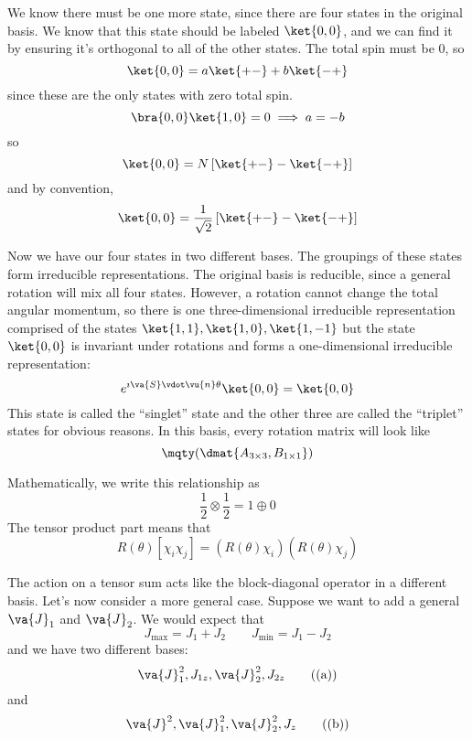 \documentclass[a4paper,twoside,master.tex]{subfiles}
\begin{document}
We know there must be one more state, since there are four states in the original basis. We know that this state should be labeled $\ket{0,0} $, and we can find it by ensuring it's orthogonal to all of the other states. The total spin must be $ 0 $, so
\begin{equation}
    \ket{0,0} = a\ket{+-} + b\ket{-+}
\end{equation}
since these are the only states with zero total spin.
\begin{equation}
    \bra{0,0}\ket{1,0} = 0 \implies a = -b
\end{equation}
so
\begin{equation}
    \ket{0,0} = N\left[\ket{+-} -\ket{-+} \right]
\end{equation}
and by convention,
\begin{equation}
    \ket{0,0} = \frac{1}{\sqrt{2}} \left[\ket{+-} -\ket{-+} \right]
\end{equation}

Now we have our four states in two different bases. The groupings of these states form irreducible representations. The original basis is reducible, since a general rotation will mix all four states. However, a rotation cannot change the total angular momentum, so there is one three-dimensional irreducible representation comprised of the states $\ket{1,1},\ket{1,0},\ket{1,-1} $ but the state $\ket{0,0} $ is invariant under rotations and forms a one-dimensional irreducible representation:
\begin{equation}
    e^{\imath \va{S} \vdot \vu{n} \theta}\ket{0,0} =\ket{0,0}
\end{equation}
This state is called the ``singlet'' state and the other three are called the ``triplet'' states for obvious reasons. In this basis, every rotation matrix will look like
\begin{equation}
    \mqty(\dmat{A_{3 \times 3}, B_{1 \times 1}})
\end{equation}

Mathematically, we write this relationship as
\begin{equation}
    \frac{1}{2} \otimes \frac{1}{2} = 1 \oplus 0
\end{equation}
The tensor product part means that
\begin{equation}
    R(\theta) [ \chi_i \chi_j] = (R(\theta) \chi_i)(R(\theta) \chi_j)
\end{equation}

The action on a tensor sum acts like the block-diagonal operator in a different basis. Let's now consider a more general case. Suppose we want to add a general $ \va{J}_1 $ and $ \va{J}_2 $. We would expect that
\begin{equation}
    J_{\text{max}} = J_1 + J_2 \qquad J_{\text{min}} = J_1 - J_2
\end{equation}
and we have two different bases:
\begin{equation}\label{eq:basis_a}
    \va{J}^2_1, J_{1z}, \va{J}^2_2, J_{2z} \tag{(a)}
\end{equation}
and
\begin{equation}\label{eq:basis_b}
    \va{J}^2, \va{J}_1^2, \va{J}_2^2, J_z \tag{(b)}
\end{equation}
\end{document}

